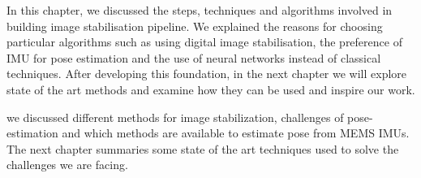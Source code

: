 

In this chapter, we discussed the steps, techniques and algorithms involved in building image stabilisation pipeline. We explained the reasons for choosing particular algorithms such as using digital image stabilisation, the preference of IMU for pose estimation and the use of neural networks instead of classical techniques. After developing this foundation, in the next chapter we will explore state of the art methods and examine how they can be used and inspire our work.

we discussed different methods for image stabilization, challenges of pose-estimation and which methods are available to estimate pose from MEMS IMUs. The next chapter summaries some state of the art techniques used to solve the challenges we are facing.

